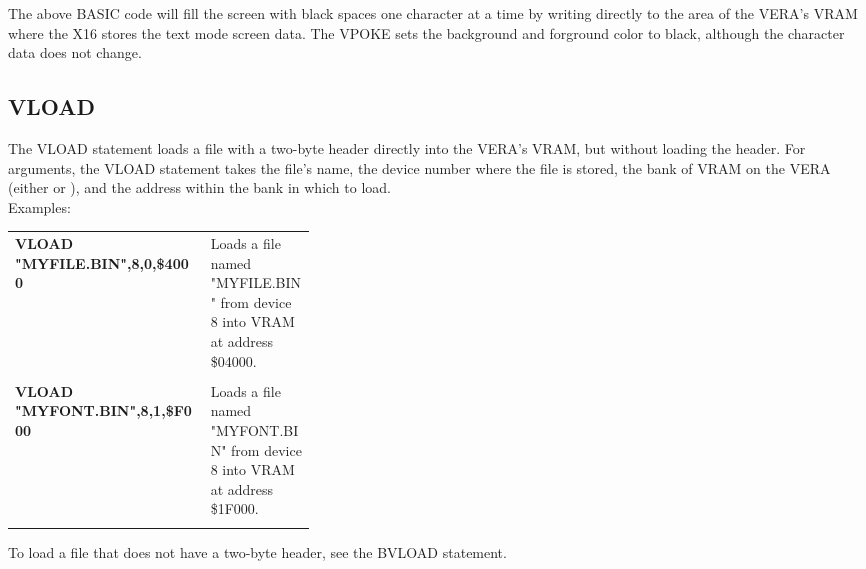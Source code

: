
The above BASIC code will fill the screen with black spaces one character at a
time by writing directly to the area of the VERA's VRAM where the X16 stores
the text mode screen data.  The {\ttfamily VPOKE} sets the background and
forground color to black, although the character data does not change.\\


\subsection{VLOAD}

The {\ttfamily VLOAD} statement loads a file with a two-byte header directly
into the VERA's VRAM, but without loading the header.  For arguments, the
{\ttfamily VLOAD} statement takes the file's name, the device number where the
file is stored, the bank of VRAM on the VERA (either {} or
{}), and the address within the bank in which to load.\\

Examples:\\

\begin{tabular}{l p{0.35\linewidth}}

	{\ttfamily\bfseries VLOAD "MYFILE.BIN",8,0,\$4000}&Loads a file named
	"MYFILE.BIN" from device 8 into VRAM at address \$04000.\\\\

	{\ttfamily\bfseries VLOAD "MYFONT.BIN",8,1,\$F000}&Loads a file named
	"MYFONT.BIN" from device 8 into VRAM at address \$1F000.\\\\

\end{tabular}

To load a file that does not have a two-byte header, see the {\ttfamily BVLOAD}
statement.\\

